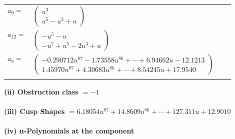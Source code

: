 \documentclass[1p]{elsarticle_modified}
\theoremstyle{definition}
\begin{document}
\begin{tabular}{m{7pt} m{180pt} m{7pt} m{180pt} }
\flushright $a_{9}=$&$\begin{pmatrix}u^3\\u^5- u^3+u\end{pmatrix}$ \\
\flushright $a_{12}=$&$\begin{pmatrix}- u^5- u\\- u^7+u^5-2 u^3+u\end{pmatrix}$ \\
\flushright $a_{8}=$&$\begin{pmatrix}-0.290712 u^{87}-1.73558 u^{86}+\cdots+6.94662 u-12.1213\\1.45970 u^{87}+4.30683 u^{86}+\cdots+8.54245 u+17.9540\end{pmatrix}$\\&\end{tabular}
\flushleft \textbf{(ii) Obstruction class $= -1$}\\~\\
\flushleft \textbf{(iii) Cusp Shapes $= 6.18054 u^{87}+14.8609 u^{86}+\cdots+127.311 u+12.9010$}\\~\\
\newpage\renewcommand{\arraystretch}{1}
\flushleft \textbf{(iv) u-Polynomials at the component}\newline \\
\end{document}
